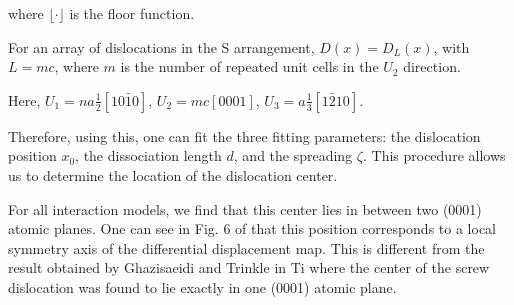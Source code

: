 \documentclass[11pt]{article}
\begin{document}
where \(\lfloor \cdot \rfloor\) is the floor function. 

For an array of dislocations in the S arrangement, \(D(x) = D_L(x)\),
with \(L = mc\), where \(m\) is the number of repeated unit cells in
the \(U_2\) direction. 

Here, \(U_1 = na \frac{1}{2} [10\bar{1}0]\), \(U_2 = mc [0001]\), 
\(U_3 =  a \frac{1}{3} [1\bar{2}10]\).

Therefore, using this, one can fit the three fitting parameters:
the dislocation position \(x_0\), the dissociation length \(d\), and the
spreading \(\zeta\). This procedure allows us to determine the
location of the dislocation center.

For all interaction models, we find that this center lies in
between two (0001) atomic planes. One can see in Fig. 6 of
\cite{Clouet2012} that this position corresponds to a local symmetry
axis of the differential displacement map. This is different from
the result obtained by Ghazisaeidi and Trinkle
\cite{Ghazisaeidi2012} in Ti where the center of the screw
dislocation was found to lie exactly in one (0001) atomic plane.

\newpage
\end{document}
